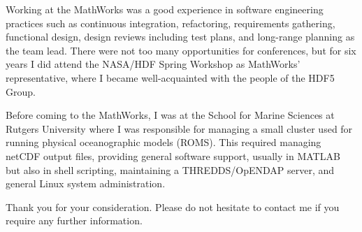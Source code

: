 \documentclass[11pt]{moderncv}  %
\begin{document}
Working at the MathWorks was a good experience in software engineering
practices such as continuous integration, refactoring, requirements
gathering, functional design, design reviews including test plans,
and long-range planning as the team lead.   There were not too many
opportunities for conferences, but for six years I did attend the
NASA/HDF Spring Workshop as MathWorks’ representative, where I
became well-acquainted with the people of the HDF5 Group.

Before coming to the MathWorks, I was at the School for Marine
Sciences at Rutgers University where I was responsible for managing
a small cluster used for running physical oceanographic models
(ROMS).  This required managing  netCDF output files, providing
general software support, usually in MATLAB but also in shell
scripting, maintaining a THREDDS/OpENDAP server, and general Linux
system administration.

Thank you for your consideration.  Please do not hesitate to contact
me if you require any further information.

\makeletterclosing
\end{document}
